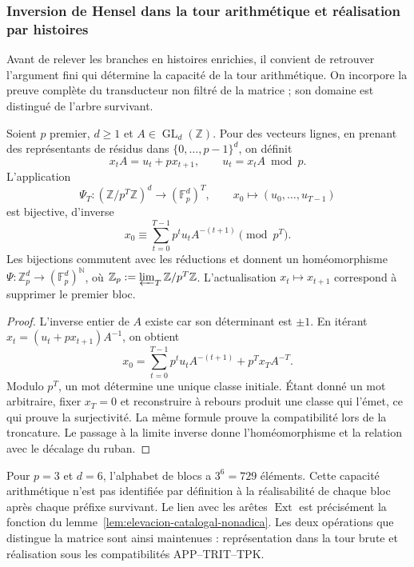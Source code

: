 \subsubsection{Inversion de Hensel dans la tour arithmétique et réalisation par histoires}
\label{sec:ch-capacidad-hensel}

Avant de relever les branches en histoires enrichies, il convient de retrouver
l’argument fini qui détermine la capacité de la tour arithmétique. On
incorpore la preuve complète du transducteur non filtré de la matrice ; son
domaine est distingué de l’arbre survivant.

\begin{proposition}
\label{prop:ch-hensel-bruto}
Soient \(p\) premier, \(d\geq1\) et \(A\in\operatorname{GL}_d(\mathbb Z)\). Pour des vecteurs lignes, en prenant des représentants de résidus dans \(\{0,\ldots,p-1\}^d\), on définit
\[
 x_tA=u_t+px_{t+1},\qquad u_t=x_tA\bmod p.
\]
L'application
\[
 \Psi_T:(\mathbb Z/p^T\mathbb Z)^d\longrightarrow
             (\mathbb F_p^d)^T,\qquad
 x_0\longmapsto(u_0,\ldots,u_{T-1})
\]
est bijective, d’inverse
\[
 x_0\equiv\sum_{t=0}^{T-1}p^tu_tA^{-(t+1)}\pmod{p^T}.
\]
Les bijections commutent avec les réductions et donnent un homéomorphisme
\(\Psi:\mathbb Z_p^d\to(\mathbb F_p^d)^{\mathbb N}\), où
\(\mathbb Z_p:=\varprojlim_T\mathbb Z/p^T\mathbb Z\). L’actualisation
\(x_t\mapsto x_{t+1}\) correspond à supprimer le premier bloc.
\end{proposition}

\begin{proof}
L'inverse entier de \(A\) existe car son déterminant est \(\pm1\). En itérant \(x_t=(u_t+px_{t+1})A^{-1}\), on obtient
\[
 x_0=\sum_{t=0}^{T-1}p^tu_tA^{-(t+1)}+p^Tx_TA^{-T}.
\]
Modulo \(p^T\), un mot détermine une unique classe initiale. Étant donné un
mot arbitraire, fixer \(x_T=0\) et reconstruire à rebours produit une
classe qui l’émet, ce qui prouve la surjectivité. La même formule
prouve la compatibilité lors de la troncature. Le passage à la limite inverse donne
l’homéomorphisme et la relation avec le décalage du ruban.
\end{proof}

Pour \(p=3\) et \(d=6\), l’alphabet de blocs a \(3^6=729\)
éléments. Cette capacité arithmétique n’est pas identifiée par définition à
la réalisabilité de chaque bloc après chaque préfixe survivant. Le
lien avec les arêtes \(\operatorname{Ext}\) est précisément la fonction
du lemme~\ref{lem:elevacion-catalogal-nonadica}. Les deux
opérations que distingue la matrice sont ainsi maintenues : représentation dans la tour brute et
réalisation sous les compatibilités APP--TRIT--TPK.

